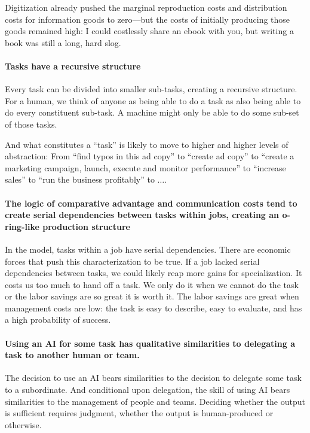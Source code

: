 \documentclass{article}
\begin{document}
Digitization already pushed the marginal reproduction costs and distribution costs for information goods to zero---but the costs of initially producing those goods remained high: I could costlessly share an ebook with you, but writing a book was still a long, hard slog.

\paragraph{Tasks have a recursive structure}
Every task can be divided into smaller sub-tasks, creating a recursive structure.
For a human, we think of anyone as being able to do a task as also being able to do every constituent sub-task.
A machine might only be able to do some sub-set of those tasks. 

And what constitutes a ``task'' is likely to move to higher and higher levels of abstraction: 
From ``find typos in this ad copy'' to ``create ad copy'' to ``create a marketing campaign, launch, execute and monitor performance'' to ``increase sales'' to ``run the business profitably'' to $\ldots$.  

\paragraph{The logic of comparative advantage and communication costs tend to create serial dependencies between tasks within jobs, creating an o-ring-like production structure}
In the model, tasks within a job have serial dependencies. 
There are economic forces that push this characterization to be true. 
If a job lacked serial dependencies between tasks, we could likely reap more gains for specialization.
It costs us too much to hand off a task.
We only do it when we cannot do the task or the labor savings are so great it is worth it. 
The labor savings are great when management costs are low: the task is easy to describe, easy to evaluate, and has a high probability of success. 

\paragraph{Using an AI for some task has qualitative similarities to delegating a task to another human or team.}
The decision to use an AI bears similarities to the decision to delegate some task to a subordinate.
And conditional upon delegation, the skill of using AI bears similarities to the management of people and teams. 
Deciding whether the output is sufficient requires judgment, whether the output is human-produced or otherwise. 
\end{document}
